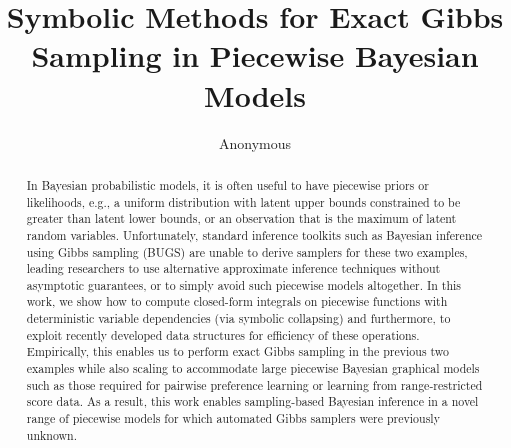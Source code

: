 \documentclass[letterpaper]{article}
\renewcommand{\-}{\text{-}}
\begin{document}
%
\title{Symbolic Methods for Exact Gibbs Sampling in Piecewise Bayesian Models}

%
%

\author{Anonymous}

\maketitle

\begin{abstract}
In Bayesian probabilistic models, it is often useful to have piecewise
priors or likelihoods, e.g., a uniform distribution with latent upper
bounds constrained to be greater than latent lower bounds, or an
observation that is the maximum of latent random variables.
Unfortunately, standard inference toolkits such as Bayesian inference
using Gibbs sampling (BUGS) are unable to derive samplers for these
two examples, leading researchers to use alternative approximate
inference techniques without asymptotic guarantees, or to simply avoid
such piecewise models altogether.  In this work, we show how to
compute closed-form integrals on piecewise functions with
deterministic variable dependencies (via symbolic collapsing) and
furthermore, to exploit recently developed data structures for
efficiency of these operations.  Empirically, this enables us to
perform exact Gibbs sampling in the previous two examples while also
scaling to accommodate large piecewise Bayesian graphical models such
as those required for pairwise preference learning or learning from
range-restricted score data.  As a result, this work enables
sampling-based Bayesian inference in a novel range of piecewise models
for which automated Gibbs samplers were previously unknown.
\end{abstract}
\end{document}
